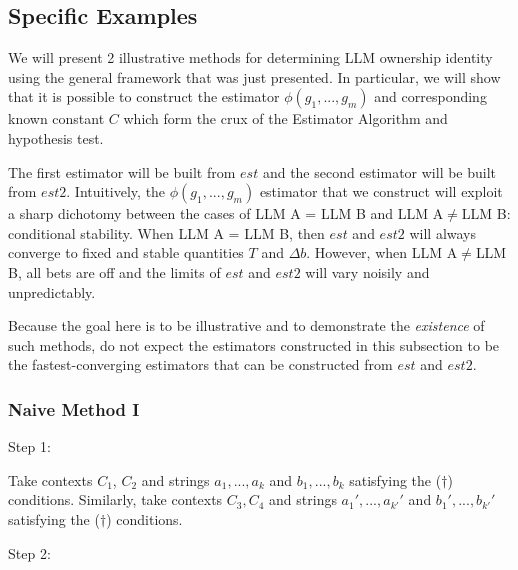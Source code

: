 \documentclass{article}
\begin{document}
\subsection{Specific Examples}

We will present 2 illustrative methods for determining LLM ownership identity using the general framework that was just presented. In particular, we will show that it is possible to construct the estimator $\displaystyle \phi \left( g_{1} ,...,g_{m}\right)$ and corresponding known constant $\displaystyle C$ which form the crux of the Estimator Algorithm and hypothesis test.



The first estimator will be built from $\displaystyle est$ and the second estimator will be built from $\displaystyle est2$. Intuitively, the $\displaystyle \phi \left( g_{1} ,...,g_{m}\right)$ estimator that we construct will exploit a sharp dichotomy between the cases of LLM A = LLM B and LLM A$\displaystyle \neq $LLM B: conditional stability. When LLM A = LLM B, then $\displaystyle est$ and $\displaystyle est2$ will always converge to fixed and stable quantities $\displaystyle T$ and $\displaystyle \Delta b$. However, when LLM A$\displaystyle \neq $LLM B, all bets are off and the limits of $\displaystyle est$ and $\displaystyle est2$ will vary noisily and unpredictably.



Because the goal here is to be illustrative and to demonstrate the \textit{existence }of such methods, do not expect the estimators constructed in this subsection to be the fastest-converging estimators that can be constructed from $\displaystyle est$ and $\displaystyle est2$.



\subsubsection{Naive Method I}

Step 1:

Take contexts $\displaystyle C_{1}$, $\displaystyle C_{2}$ and strings $\displaystyle a_{1} ,...,a_{k}$ and $\displaystyle b_{1} ,...,b_{k}$ satisfying the ($\displaystyle \dagger $) conditions. Similarly, take contexts $\displaystyle C_{3} ,C_{4}$ and strings $\displaystyle a_{1} ',...,a_{k'} '$ and $\displaystyle b_{1} ',...,b_{k'} '$ satisfying the ($\displaystyle \dagger $) conditions.



Step 2:
\end{document}
